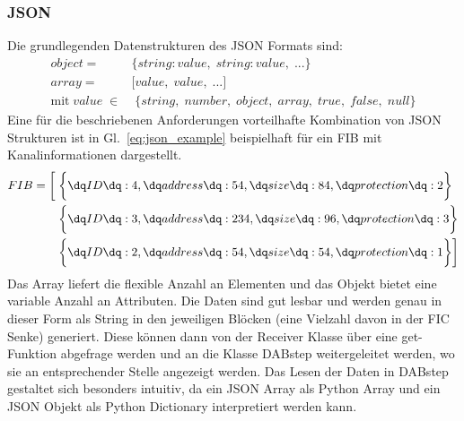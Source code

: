 \subsubsection{JSON}
Die grundlegenden Datenstrukturen des JSON Formats sind:
\begin{equation}
\begin{aligned}
object =& \biggl\{string : value,\;string : value,\; ...\biggl\} \\
array =& \biggl[value, \;value, \;...\biggl] \\
\text{mit} \; value \; \in& \; \{string,\; number,\; object,\; array,\; true,\; false,\; null\}
\end{aligned}
\end{equation}
Eine für die beschriebenen Anforderungen vorteilhafte Kombination von JSON Strukturen ist in Gl.~\ref{eq:json_example} beispielhaft für ein FIB mit Kanalinformationen dargestellt.
\begin{equation}
\label{eq:json_example}
\begin{aligned}
FIB = \biggl[
& \; \biggl \{ \text{\dq} ID \text{\dq} :4, \text{\dq} address \text{\dq} : 54, \text{\dq} size \text{\dq} : 84, \text{\dq} protection \text{\dq} : 2 \biggl \} \\
& \; \biggl\{\text{\dq}ID\text{\dq}:3,\text{\dq}address\text{\dq}:234,\text{\dq}size\text{\dq}:96,\text{\dq}protection\text{\dq}:3\biggl\} \\
& \; \biggl\{\text{\dq}ID\text{\dq}:2,\text{\dq}address\text{\dq}:54,\text{\dq}size\text{\dq}:54,\text{\dq}protection\text{\dq}:1\biggl\} \biggl]
\end{aligned}
\end{equation}
Das Array liefert die flexible Anzahl an Elementen und das Objekt bietet eine variable Anzahl an Attributen. Die Daten sind gut lesbar und werden genau in dieser Form als String in den jeweiligen Blöcken (eine Vielzahl davon in der FIC Senke) generiert. Diese können dann von der Receiver Klasse über eine get-Funktion abgefrage werden und an die Klasse DABstep weitergeleitet werden, wo sie an entsprechender Stelle angezeigt werden. Das Lesen der Daten in DABstep gestaltet sich besonders intuitiv, da ein JSON Array als Python Array und ein JSON Objekt als Python Dictionary interpretiert werden kann.

